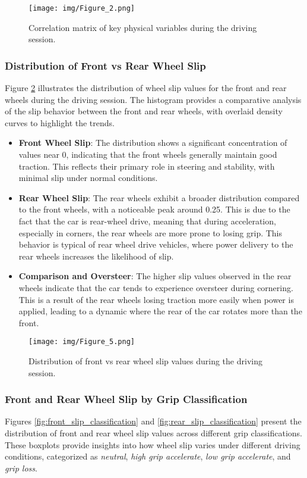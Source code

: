 \documentclass[a4paper,final,12pt]{report}
\begin{document}
\begin{figure}[H]
    \centering
    \texttt{[image: img/Figure\_2.png]}
    \caption{Correlation matrix of key physical variables during the driving session.}
    \label{fig:correlation_matrix}
\end{figure}

\subsubsection{Distribution of Front vs Rear Wheel Slip}
Figure \ref{fig:front_rear_slip_distribution} illustrates the distribution of wheel slip values for the front and rear wheels during the driving session. The histogram provides a comparative analysis of the slip behavior between the front and rear wheels, with overlaid density curves to highlight the trends.

\begin{itemize}
    \item \textbf{Front Wheel Slip}: The distribution shows a significant concentration of values near 0, indicating that the front wheels generally maintain good traction. This reflects their primary role in steering and stability, with minimal slip under normal conditions.
    \item \textbf{Rear Wheel Slip}: The rear wheels exhibit a broader distribution compared to the front wheels, with a noticeable peak around 0.25. This is due to the fact that the car is rear-wheel drive, meaning that during acceleration, especially in corners, the rear wheels are more prone to losing grip. This behavior is typical of rear wheel drive vehicles, where power delivery to the rear wheels increases the likelihood of slip.
    \item \textbf{Comparison and Oversteer}: The higher slip values observed in the rear wheels indicate that the car tends to experience oversteer during cornering. This is a result of the rear wheels losing traction more easily when power is applied, leading to a dynamic where the rear of the car rotates more than the front.
\end{itemize}
\begin{figure}[H]
    \centering
    \texttt{[image: img/Figure\_5.png]}
    \caption{Distribution of front vs rear wheel slip values during the driving session.}
    \label{fig:front_rear_slip_distribution}
\end{figure}

\subsubsection{Front and Rear Wheel Slip by Grip Classification}
Figures \ref{fig:front_slip_classification} and \ref{fig:rear_slip_classification} present the distribution of front and rear wheel slip values across different grip classifications. These boxplots provide insights into how wheel slip varies under different driving conditions, categorized as \textit{neutral}, \textit{high grip accelerate}, \textit{low grip accelerate}, and \textit{grip loss}.
\end{document}
